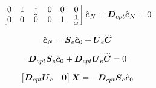 \begin{equation*}
    \begin{bmatrix}
        0   &   1   &   \frac{1}{\omega}    &   0   &   0   &   0\\
        0   &   0   &   0                   &   0   &   1   &   \frac{1}{\omega}\\
    \end{bmatrix}
    \hat{\mbox{\boldmath $c$}}_N = 
    \mbox{\boldmath $D$}_{cpt} \hat{\mbox{\boldmath $c$}}_N = 0
\end{equation*}


\begin{equation*}
    \cstate_N = \M{S}_e \cstate_0     +   \M{U}_e \cJerk
\end{equation*}

\begin{equation*}
    \M{D}_{cpt} \M{S}_e \cstate_0     +  \M{D}_{cpt} \M{U}_e \cJerk = 0
\end{equation*}

\begin{align*}
    \begin{bmatrix}
        \mbox{\boldmath $D$}_{cpt} \mbox{\boldmath $U$}_e     &   \mbox{\boldmath $0$} \\
    \end{bmatrix}
    \mbox{\boldmath $X$}
    = -\mbox{\boldmath $D$}_{cpt} \mbox{\boldmath $S$}_e \hat{\mbox{\boldmath $c$}}_0
\end{align*}

